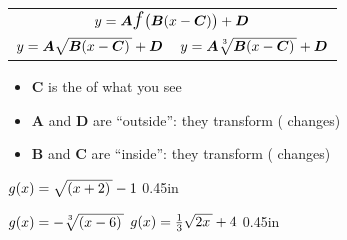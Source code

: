 \begin{tcolorbox}[center,colback=white,width=6in,]
    \centering
    {
    \large
    \renewcommand{\arraystretch}{1.5}
    \addtolength{\tabcolsep}{2em}
    \begin{tabular}{lr}
        \multicolumn{2}{c}{
            $y = \bm{A} \text{\Large $f$}\!\left( \text{\rule{0pt}{0.9em}}\bm{B}(x-\bm{C})\right) + \bm{D}$ 
            }\\
            {\footnotesize $y = \bm{A} \myRoot{ \bm{B}(x-\bm{C})} + \bm{D}$}
            &%
            {\footnotesize $y = \bm{A} \myRoot[3]{ \bm{B}(x-\bm{C})} + \bm{D}$}
    \end{tabular}
    }
    \tcblower 
    \begin{itemize}[fullwidth]
        \item {$\bm{C}$ is the  of what you see}
        \item $\bm{A}$ and $\bm{D}$ are ``outside'': they transform  ( changes)
        \item $\bm{B}$ and $\bm{C}$ are ``inside'': they transform  ( changes)
    \end{itemize}
\end{tcolorbox}

{
    $g(x) =  \myRoot{(x+2)} - 1$
}
{0.45in}

\myProblems
{
    $g(x) =  -\myRoot[3]{(x-6)} $
}
{
    $g(x) =  \frac{1}{3}\myRoot{2x} + 4 $
}
{0.45in}
